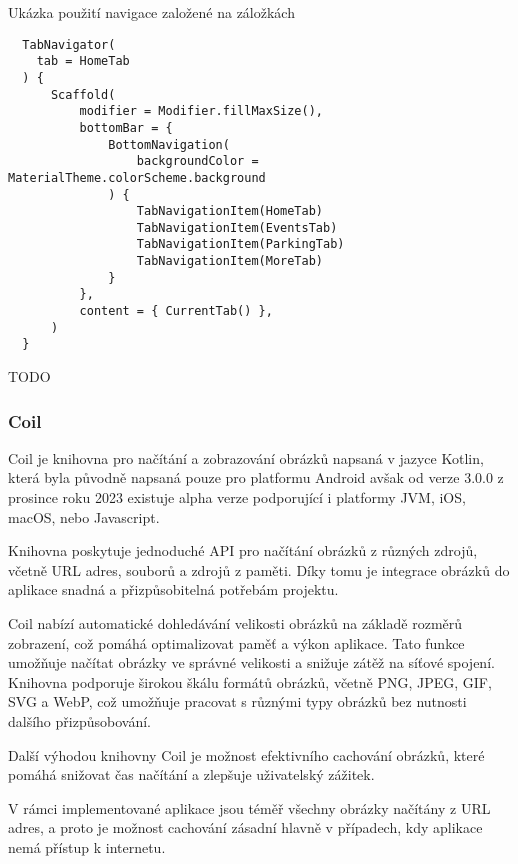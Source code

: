 
 
 
\begin{listing}[H]
\caption{Ukázka použití navigace založené na záložkách}\label{lst:tabNav}
\begin{verbatim}
  TabNavigator(
    tab = HomeTab
  ) {
      Scaffold(
          modifier = Modifier.fillMaxSize(),
          bottomBar = {
              BottomNavigation(
                  backgroundColor = MaterialTheme.colorScheme.background
              ) {
                  TabNavigationItem(HomeTab)
                  TabNavigationItem(EventsTab)
                  TabNavigationItem(ParkingTab)
                  TabNavigationItem(MoreTab)
              }
          },
          content = { CurrentTab() },
      )
  }
\end{verbatim}
\end{listing}
TODO


\subsubsection*{Coil}
Coil je knihovna pro načítání a zobrazování obrázků napsaná v jazyce Kotlin, která byla původně napsaná pouze pro platformu Android avšak
od verze 3.0.0 z prosince roku 2023 existuje alpha verze podporující i platformy JVM, iOS, macOS, nebo Javascript.  

Knihovna poskytuje jednoduché API pro načítání obrázků
z různých zdrojů, včetně URL adres, souborů a zdrojů z paměti. Díky tomu je integrace obrázků do aplikace snadná a přizpůsobitelná potřebám projektu.

Coil nabízí automatické dohledávání velikosti obrázků na základě rozměrů zobrazení, což pomáhá optimalizovat paměť a výkon aplikace. Tato funkce 
umožňuje načítat obrázky ve správné velikosti a snižuje zátěž na síťové spojení. Knihovna podporuje širokou škálu formátů obrázků, včetně PNG, 
JPEG, GIF, SVG a WebP, což umožňuje pracovat s různými typy obrázků bez nutnosti dalšího přizpůsobování.

Další výhodou knihovny Coil je možnost efektivního cachování obrázků, které pomáhá snižovat čas načítání a zlepšuje uživatelský zážitek.

V rámci implementované aplikace jsou téměř všechny obrázky načítány z URL adres, a proto je možnost cachování zásadní hlavně v případech, 
kdy aplikace nemá přístup k internetu.

